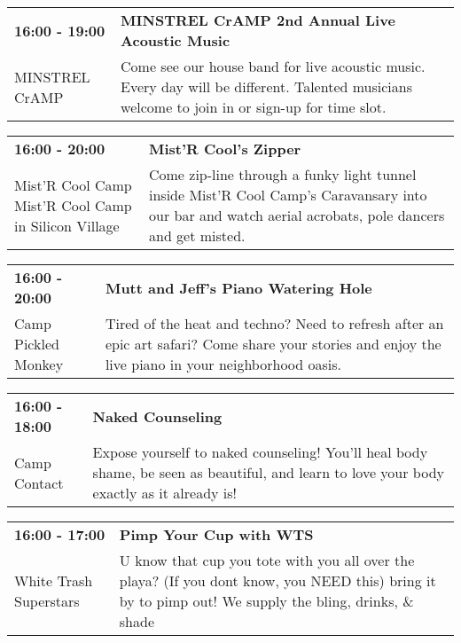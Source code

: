 \begin{tabular}{ p{1in} p{2.2in} }
    \textbf{16:00 - 19:00} & \textbf{MINSTREL CrAMP 2nd Annual Live Acoustic Music} \\
    MINSTREL CrAMP \newline  & Come see our house band for live acoustic music.  Every day will be different.  Talented musicians welcome to join in or sign-up for time slot. \\
    \hline 
\end{tabular}
    
\begin{tabular}{ p{1in} p{2.2in} }
    \textbf{16:00 - 20:00} & \textbf{Mist'R Cool's Zipper} \\
    Mist'R Cool Camp \newline Mist'R Cool Camp in Silicon Village & Come zip-line through a funky light tunnel inside Mist'R Cool Camp's Caravansary into our bar and watch aerial acrobats, pole dancers and get misted. \\
    \hline 
\end{tabular}
    
\begin{tabular}{ p{1in} p{2.2in} }
    \textbf{16:00 - 20:00} & \textbf{Mutt and Jeff's Piano Watering Hole} \\
    Camp Pickled Monkey \newline  & Tired of the heat and techno? Need to refresh after an epic art safari? Come share your stories and enjoy the live piano in your neighborhood oasis. \\
    \hline 
\end{tabular}
    
\begin{tabular}{ p{1in} p{2.2in} }
    \textbf{16:00 - 18:00} & \textbf{Naked Counseling} \\
    Camp Contact \newline  & Expose yourself to naked counseling! You'll heal body shame, be seen as beautiful, and learn to love your body exactly as it already is! \\
    \hline 
\end{tabular}
    
\begin{tabular}{ p{1in} p{2.2in} }
    \textbf{16:00 - 17:00} & \textbf{Pimp Your Cup with WTS} \\
    White Trash Superstars \newline  & U know that cup you tote with you all over the playa? (If you dont know, you NEED this) bring it by to pimp out! We supply the bling, drinks, \& shade \\
    \hline 
\end{tabular}
    
